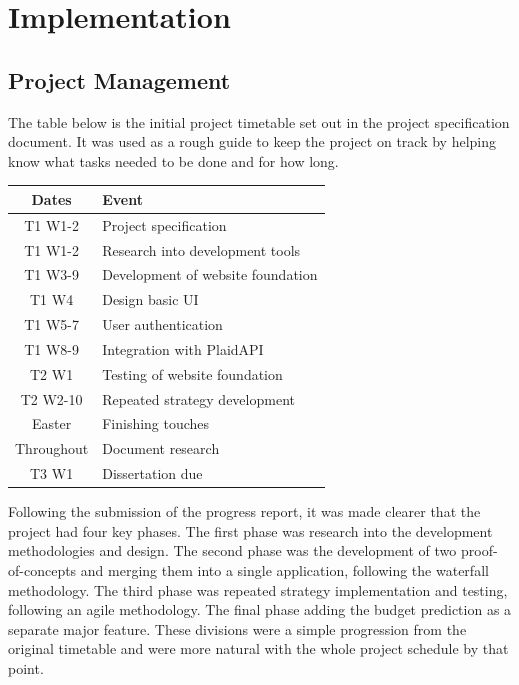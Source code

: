 \chapter{Implementation}
\label{ch:implementation}

\section{Project Management}
The table below is the initial project timetable set out in the project specification document. It was used as a rough guide to keep the project on track by helping know what tasks needed to be done and for how long. 

\begin{center}
	\begin{tabular}{ | c | l | }
		\hline
		\textbf{Dates} & \textbf{Event} \\ \hline
		T1 W1-2 & Project specification \\ \hline
		T1 W1-2 & Research into development tools \\ \hline
		T1 W3-9 & Development of website foundation \\ \hline
		T1 W4 & Design basic UI \\ \hline
		T1 W5-7 & User authentication \\ \hline
		T1 W8-9 & Integration with PlaidAPI \\ \hline
		T2 W1 & Testing of website foundation \\ \hline
		T2 W2-10 & Repeated strategy development \\ \hline
		Easter & Finishing touches \\ \hline
		Throughout & Document research \\ \hline
		T3 W1 & Dissertation due \\ \hline
	\end{tabular}
\end{center}

Following the submission of the progress report, it was made clearer that the project had four key phases. The first phase was research into the development methodologies and design. The second phase was the development of two proof-of-concepts and merging them into a single application, following the waterfall methodology. The third phase was repeated strategy implementation and testing, following an agile methodology. The final phase adding the budget prediction as a separate major feature. These divisions were a simple progression from the original timetable and were more natural with the whole project schedule by that point.

